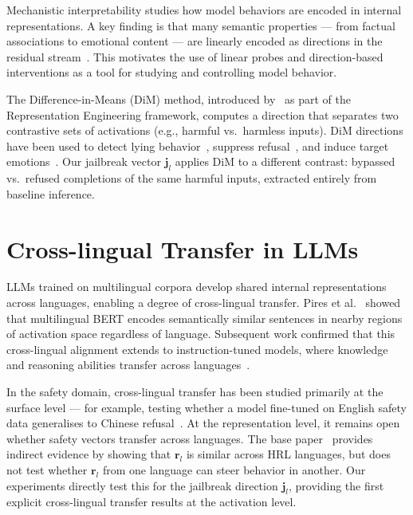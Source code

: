 Mechanistic interpretability studies how model behaviors are encoded in internal representations. A key finding is that many semantic properties — from factual associations to emotional content — are linearly encoded as directions in the residual stream~\citep{elhage2022superposition, burns2022discovering}. This motivates the use of linear probes and direction-based interventions as a tool for studying and controlling model behavior.

The Difference-in-Means (DiM) method, introduced by~\citet{zou2023representation} as part of the Representation Engineering framework, computes a direction that separates two contrastive sets of activations (e.g., harmful vs.\ harmless inputs). DiM directions have been used to detect lying behavior~\citep{marks2023geometry}, suppress refusal~\citep{arditi2024refusal}, and induce target emotions~\citep{zou2023representation}. Our jailbreak vector $\mathbf{j}_l$ applies DiM to a different contrast: bypassed vs.\ refused completions of the same harmful inputs, extracted entirely from baseline inference.

\section{Cross-lingual Transfer in LLMs}

LLMs trained on multilingual corpora develop shared internal representations across languages, enabling a degree of cross-lingual transfer. Pires et al.~\citeyearpar{pires2019multilingual} showed that multilingual BERT encodes semantically similar sentences in nearby regions of activation space regardless of language. Subsequent work confirmed that this cross-lingual alignment extends to instruction-tuned models, where knowledge and reasoning abilities transfer across languages~\citep{shi2022language, zhao2024llm}.

In the safety domain, cross-lingual transfer has been studied primarily at the surface level — for example, testing whether a model fine-tuned on English safety data generalises to Chinese refusal~\citep{wang2023allsafe}. At the representation level, it remains open whether safety vectors transfer across languages. The base paper~\citep{arditi2024refusal} provides indirect evidence by showing that $\mathbf{r}_l$ is similar across HRL languages, but does not test whether $\mathbf{r}_l$ from one language can steer behavior in another. Our experiments directly test this for the jailbreak direction $\mathbf{j}_l$, providing the first explicit cross-lingual transfer results at the activation level.

